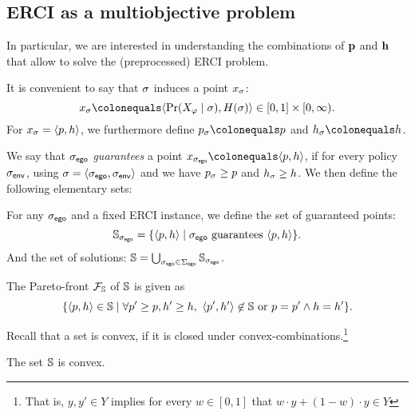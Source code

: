 {{{{\subsection{ERCI as a multiobjective problem}

In particular, we are interested in understanding the combinations of $\mathbf{p}$ and $\mathbf{h}$ that allow to solve the (preprocessed) ERCI problem. 

It is convenient to say that $\sigma$ induces a point $x_\sigma$: \[x_\sched \colonequals \langle \Pr(X_\varphi \mid \sched), H(\sched)  \rangle \in [0,1] \times [0,\infty).\] 
For $x_\sigma = \langle p,h \rangle$, we furthermore define $\scp_\sched \colonequals \scp$ and $\rndp_\sched \colonequals \rndp$.

We say that ${\sigma_{\mathsf{ego}}}$ \emph{guarantees} a point $x_\pOneSched \colonequals \langle \scp, \rndp \rangle$, if for every policy ${\sigma_{\mathsf{env}}}$, using $\sigma = \langle {\sigma_{\mathsf{ego}}}, {\sigma_{\mathsf{env}}} \rangle$ and we have $p_\sigma \geq p$ and $h_\sigma \geq h$.
We then define the following elementary sets:
\begin{definition}[Solutions]
For any ${\sigma_{\mathsf{ego}}}$ and a fixed ERCI instance, we define the set of guaranteed points:
  \[ \mathbb{S}_{\sigma_{\mathsf{ego}}} = \{ \langle p, h \rangle \mid  {\sigma_{\mathsf{ego}}} \text{ guarantees } \langle p, h \rangle \}. \]
And the set of solutions:    	
 $ \mathbb{S} = \bigcup_{{\sigma_{\mathsf{ego}}} \in \Sigma_{\mathsf{ego}}} \mathbb{S}_{\sigma_{\mathsf{ego}}}$.
\end{definition}
The Pareto-front $\mathcal{F}_{\mathbb{S}}$ of $\mathbb{S}$ is given as \[ \{ \langle p, h \rangle \in \mathbb{S} \mid \forall p' \geq p, h' \geq h, \ \langle p', h' \rangle \not\in \mathbb{S} \text{ or } p = p' \land  h = h'  \}. \]

\begin{example}
	
\end{example}

Recall that a set is convex, if it is closed under convex-combinations.\footnote{That is, $y, y' \in Y$ implies for every $w \in [0,1]$ that $w \cdot y + (1-w) \cdot y \in Y$}
\begin{proposition}
	The set $\mathbb{S}$ is convex. 
\end{proposition}

}}}}
